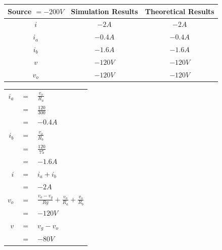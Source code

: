 \documentclass[a4paper]{article}
\begin{document}
\begin{itemize}
\begin{tabular}{|c|c|c|}
	      	Source $= -200 V$ & Simulation Results & Theoretical Results \\
	      	\hline
	      	$i$               & $-2A$              & $-2A$               \\
	      	\hline
	      	$i_{a}$           & $-0.4A$            & $-0.4A$             \\
	      	\hline
	      	$i_{b}$           & $-1.6A$            & $-1.6A$             \\
	      	\hline
	      	$v$               & $-120V$            & $-120V$             \\
	      	\hline
	      	$v_{o}$           & $-120V$            & $-120V$             \\
	      	\hline
	      \end{tabular} 
	      \begin{tabular}{rcl}
	      	$i_{a}$ & $=$ & $\frac{v_{o}}{R_{a}}$                                                    \\
	      	        & $=$ & $\frac{120}{300}$                                                        \\
	      	        & $=$ & $-0.4A$                                                                  \\
	      	$i_{b}$ & $=$ & $\frac{v_{o}}{R_{b}}$                                                    \\
	      	        & $=$ & $\frac{120}{75}$                                                         \\
	      	        & $=$ & $-1.6A$                                                                  \\
	      	$i$     & $=$ & $i_{a} + i_{b}$                                                          \\
	      	        & $=$ & $-2A$                                                                    \\
	      	$v_{o}$ & $=$ & $\frac{v_{o} - v_{g}}{R{g}} + \frac{v_{o}}{R_{a}} + \frac{v_{o}}{R_{b}}$ \\
	      	        & $=$ & $-120V$                                                                  \\
	      	$v$     & $=$ & $v_{g} - v_{o}$                                                          \\
	      	        & $=$ & $-80V$                                                                   \\
	      \end{tabular}

\end{itemize}
\end{document}
